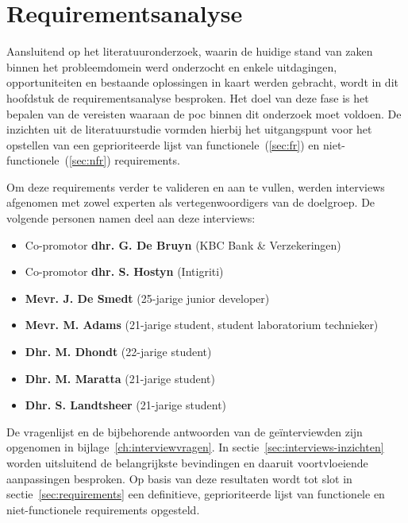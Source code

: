 
\chapter{Requirementsanalyse}%
\label{ch:requirementsanalyse}

Aansluitend op het literatuuronderzoek, waarin de huidige stand van zaken binnen het probleemdomein werd onderzocht en enkele uitdagingen, opportuniteiten en bestaande oplossingen in kaart werden gebracht, wordt in dit hoofdstuk de requirementsanalyse besproken. Het doel van deze fase is het bepalen van de vereisten waaraan de \acrlong{poc} binnen dit onderzoek moet voldoen. De inzichten uit de literatuurstudie vormden hierbij het uitgangspunt voor het opstellen van een geprioriteerde lijst van functionele~(\ref{sec:fr}) en niet-functionele~(\ref{sec:nfr}) requirements.

\vspace{1em}

Om deze requirements verder te valideren en aan te vullen, werden interviews afgenomen met zowel experten als vertegenwoordigers van de doelgroep. De volgende personen namen deel aan deze interviews:

\begin{itemize}
    \item Co-promotor \textbf{dhr. G. De Bruyn} (KBC Bank \& Verzekeringen)
    \item Co-promotor \textbf{dhr. S. Hostyn} (Intigriti)
    \item \textbf{Mevr. J. De Smedt} (25-jarige junior developer)
    \item \textbf{Mevr. M. Adams} (21-jarige student, student laboratorium technieker)
    \item \textbf{Dhr. M. Dhondt} (22-jarige student)
    \item \textbf{Dhr. M. Maratta} (21-jarige student)
    \item \textbf{Dhr. S. Landtsheer} (21-jarige student)
\end{itemize}

De vragenlijst en de bijbehorende antwoorden van de geïnterviewden zijn opgenomen in bijlage~\ref{ch:interviewvragen}. In sectie~\ref{sec:interviews-inzichten} worden uitsluitend de belangrijkste bevindingen en daaruit voortvloeiende aanpassingen besproken. Op basis van deze resultaten wordt tot slot in sectie~\ref{sec:requirements} een definitieve, geprioriteerde lijst van functionele en niet-functionele requirements opgesteld.

